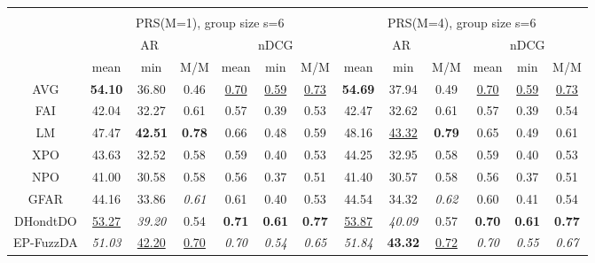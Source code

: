 \begin{tabular}{ c | c c c | c c c || c c c | c c c}
\multicolumn{12}{c}{} \\
\multicolumn{1}{c}{} & \multicolumn{6}{c}{PRS(M=1), group size s=6} & \multicolumn{6}{c}{PRS(M=4), group size s=6} \\
\multicolumn{1}{c}{} & \multicolumn{3}{c}{AR} & \multicolumn{3}{c}{nDCG} & \multicolumn{3}{c}{AR} & \multicolumn{3}{c}{nDCG} \\
& mean & min & M/M & mean & min & M/M & mean & min & M/M & mean & min & M/M \\
\hline
AVG & \textbf{54.10} & 36.80 & 0.46 & \underline{0.70} & \underline{0.59} & \underline{0.73} & \textbf{54.69} & 37.94 & 0.49 & \underline{0.70} & \underline{0.59} & \underline{0.73} \\
FAI & 42.04 & 32.27 & 0.61 & 0.57 & 0.39 & 0.53 & 42.47 & 32.62 & 0.61 & 0.57 & 0.39 & 0.54 \\
LM & 47.47 & \textbf{42.51} & \textbf{0.78} & 0.66 & 0.48 & 0.59 & 48.16 & \underline{43.32} & \textbf{0.79} & 0.65 & 0.49 & 0.61 \\
XPO & 43.63 & 32.52 & 0.58 & 0.59 & 0.40 & 0.53 & 44.25 & 32.95 & 0.58 & 0.59 & 0.40 & 0.53 \\
NPO & 41.00 & 30.58 & 0.58 & 0.56 & 0.37 & 0.51 & 41.40 & 30.57 & 0.58 & 0.56 & 0.37 & 0.51 \\
GFAR & 44.16 & 33.86 & \textit{0.61} & 0.61 & 0.40 & 0.53 & 44.54 & 34.32 & \textit{0.62} & 0.60 & 0.41 & 0.54 \\
DHondtDO & \underline{53.27} & \textit{39.20} & 0.54 & \textbf{0.71} & \textbf{0.61} & \textbf{0.77} & \underline{53.87} & \textit{40.09} & 0.57 & \textbf{0.70} & \textbf{0.61} & \textbf{0.77} \\
EP-FuzzDA & \textit{51.03} & \underline{42.20} & \underline{0.70} & \textit{0.70} & \textit{0.54} & \textit{0.65} & \textit{51.84} & \textbf{43.32} & \underline{0.72} & \textit{0.70} & \textit{0.55} & \textit{0.67} \\


\end{tabular}
